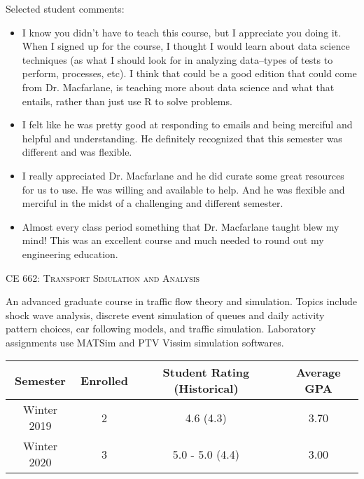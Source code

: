 \documentclass[margin,line]{res}
\newif\ifdetail
\newcommand{\acc}{\scshape }
\begin{document}
\begin{resume}
Selected student comments:
\begin{itemize}
  \item I know you didn't have to teach this course, but I appreciate you doing it.
    When I signed up for the course, I thought I would learn about data science
    techniques (as what I should look for in analyzing data--types of tests to
    perform, processes, etc). I think that could be a good edition that could
    come from Dr. Macfarlane, is teaching more about data science and what that
    entails, rather than just use R to solve problems.
    \item I felt like he was pretty good at responding to emails and being merciful and helpful and understanding. He definitely recognized that this semester was different and was flexible.
    \item I really appreciated Dr. Macfarlane and he did curate some great resources for us to use. He was willing and available to help. And he was flexible and merciful in the midst of a challenging and different semester.
    \item Almost every class period something that Dr. Macfarlane taught blew my mind! This was an excellent course and much needed to round out my engineering education.
\end{itemize}

\fi



\vspace{.4cm}
{\acc CE 662: Transport Simulation and Analysis}

\vspace{-.4cm}
An advanced graduate course in traffic flow theory and simulation. Topics
include shock wave analysis, discrete event simulation of queues and daily
activity pattern choices, car following models, and traffic simulation.
Laboratory assignments use MATSim and PTV Vissim simulation softwares.


\ifdetail
\begin{tabular}{cccc}
  \toprule
  Semester & Enrolled & Student Rating (Historical) & Average GPA\\
  \midrule
  Winter 2019 & 2 & 4.6 (4.3) & 3.70 \\
  Winter 2020 & 3 & 5.0 - 5.0 (4.4) & 3.00 \\
  \bottomrule
\end{tabular}


\end{resume}
\end{document}
